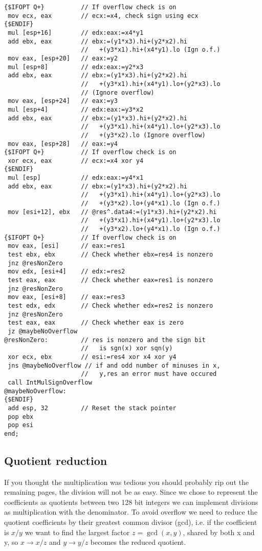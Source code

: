 \begin{multicols}{2}
{\begin{verbatim}
{$IFOPT Q+}          // If overflow check is on
 mov ecx, eax        // ecx:=x4, check sign using ecx
{$ENDIF}
 mul [esp+16]        // edx:eax:=x4*y1
 add ebx, eax        // ebx:=(y1*x3).hi+(y2*x2).hi
                     //   +(y3*x1).hi+(x4*y1).lo (Ign o.f.)
 mov eax, [esp+20]   // eax:=y2
 mul [esp+8]         // edx:eax:=y2*x3
 add ebx, eax        // ebx:=(y1*x3).hi+(y2*x2).hi
                     //   +(y3*x1).hi+(x4*y1).lo+(y2*x3).lo
                     // (Ignore overflow)
 mov eax, [esp+24]   // eax:=y3
 mul [esp+4]         // edx:eax:=y3*x2
 add ebx, eax        // ebx:=(y1*x3).hi+(y2*x2).hi
                     //   +(y3*x1).hi+(x4*y1).lo+(y2*x3).lo
                     //   +(y3*x2).lo (Ignore overflow)
 mov eax, [esp+28]   // eax:=y4
{$IFOPT Q+}          // If overflow check is on
 xor ecx, eax        // ecx:=x4 xor y4
{$ENDIF}
 mul [esp]           // edx:eax:=y4*x1
 add ebx, eax        // ebx:=(y1*x3).hi+(y2*x2).hi
                     //   +(y3*x1).hi+(x4*y1).lo+(y2*x3).lo
                     //   +(y3*x2).lo+(y4*x1).lo (Ign o.f.)
 mov [esi+12], ebx   // @res^.data4:=(y1*x3).hi+(y2*x2).hi
                     //   +(y3*x1).hi+(x4*y1).lo+(y2*x3).lo
                     //   +(y3*x2).lo+(y4*x1).lo (Ign o.f.)
{$IFOPT Q+}          // If overflow check is on
 mov eax, [esi]      // eax:=res1
 test ebx, ebx       // Check whether ebx=res4 is nonzero
 jnz @resNonZero
 mov edx, [esi+4]    // edx:=res2
 test eax, eax       // Check whether eax=res1 is nonzero
 jnz @resNonZero
 mov eax, [esi+8]    // eax:=res3
 test edx, edx       // Check whether edx=res2 is nonzero
 jnz @resNonZero
 test eax, eax       // Check whether eax is zero
 jz @maybeNoOverflow
@resNonZero:         // res is nonzero and the sign bit
                     //   is sgn(x) xor sqn(y)
 xor ecx, ebx        // esi:=res4 xor x4 xor y4
 jns @maybeNoOverflow // if and odd number of minuses in x,
                     //   y,res an error must have occured
 call IntMulSignOverflow
@maybeNoOverflow:
{$ENDIF}
 add esp, 32         // Reset the stack pointer
 pop ebx
 pop esi
end;
\end{verbatim}
}
\end{multicols}

\subsection{Quotient reduction}
If you thought the multiplication was tedious you should probably rip out the remaining pages, the division will not be as easy.
Since we chose to represent the coefficients as quotients between two 128 bit integers we can implement divisions as multiplication with the denominator. 
To avoid overflow we need to reduce the quotient coefficients by their greatest common divisor (gcd), i.e. if the coefficient is $x/y$ we want to find the largest factor $z=\gcd(x,y)$, shared by both x and y, so $x\rightarrow x/z$ and $y\rightarrow y/z$ becomes the reduced quotient.

